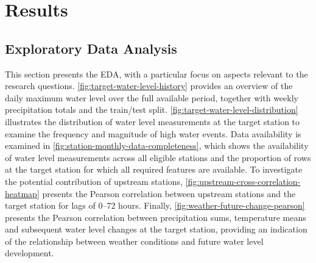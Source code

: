 \chapter{Results}


\section{Exploratory Data Analysis}
This section presents the \ac{EDA}, with a particular focus on aspects relevant to the research questions.
\autoref{fig:target-water-level-history} provides an overview of the daily maximum water level over the full available period, together with weekly precipitation totals and the train/test split.
\autoref{fig:target-water-level-distribution} illustrates the distribution of water level measurements at the target station to examine the frequency and magnitude of high water events.
Data availability is examined in \autoref{fig:station-monthly-data-completeness}, which shows the availability of water level measurements across all eligible stations and the proportion of rows at the target station for which all required features are available.
To investigate the potential contribution of upstream stations, \autoref{fig:upstream-cross-correlation-heatmap} presents the Pearson correlation between upstream stations and the target station for lags of 0--72 hours.
Finally, \autoref{fig:weather-future-change-pearson} presents the Pearson correlation between precipitation sums, temperature means and subsequent water level changes at the target station, providing an indication of the relationship between weather conditions and future water level development.

